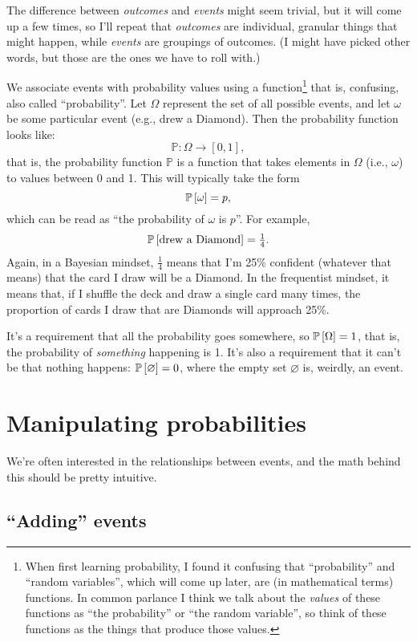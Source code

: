 The difference between \emph{outcomes} and \emph{events} might seem trivial,
but it will come up a few times, so I'll repeat that \emph{outcomes} are
individual, granular things that might happen, while \emph{events} are
groupings of outcomes. (I might have picked other words, but those are the
ones we have to roll with.)

We associate events with probability values using a function\footnote{When
first learning probability, I found it confusing that ``probability'' and
``random variables'', which will come up later, are (in mathematical terms)
functions. In common parlance I think we talk about the \emph{values} of these
functions as ``the probability'' or ``the random variable'', so think of these
functions as the things that produce those values.} that is, confusing, also
called ``probability''. Let $\Omega$ represent the set of all possible events,
and let $\omega$ be some particular event (e.g., drew a Diamond). Then the
probability function looks like:
$$
\mathbb{P} : \Omega \to [0, 1],
$$
that is, the probability function $\mathbb{P}$ is a function that takes
elements in $\Omega$ (i.e., $\omega$) to values between 0 and 1. This will
typically take the form
$$
\mathbb{P}\left[{\omega}\right] = p,
$$
which can be read as ``the probability of $\omega$ is $p$''. For example,
$$
\mathbb{P}\left[{\text{drew a Diamond}}\right] = \tfrac{1}{4}.
$$
Again, in a Bayesian mindset, $\tfrac{1}{4}$ means that I'm 25\% confident
(whatever that means) that the card I draw will be a Diamond. In the
frequentist mindset, it means that, if I shuffle the deck and draw a single
card many times, the proportion of cards I draw that are Diamonds will
approach 25\%.

It's a requirement that all the probability goes somewhere, so $\mathbb{P}\left[{\Omega}\right] = 1$,
that is, the probability of \emph{something} happening is 1. It's also a
requirement that it can't be that nothing happens: $\mathbb{P}\left[{\varnothing}\right] = 0$,
where the empty set $\varnothing$ is, weirdly, an event.

\section{Manipulating probabilities}

We're often interested in the relationships between events, and the math
behind this should be pretty intuitive.

\subsection{``Adding'' events}

